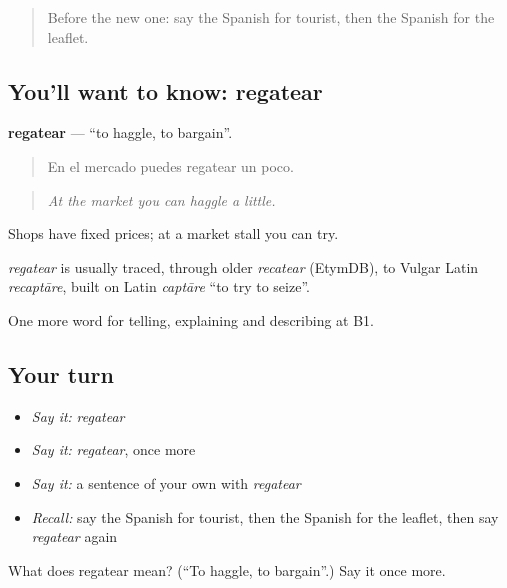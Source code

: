 \label{lesson:ES-C676-regatear}



\begin{quote}
Before the new one: say the Spanish for tourist, then the Spanish for the leaflet.
\end{quote}

\subsection*{You'll want to know: regatear}
\textbf{regatear} — \textquotedblleft{}to haggle, to bargain\textquotedblright{}.

\begin{quote}
En el mercado puedes regatear un poco.
\end{quote}

\begin{quote}
\emph{At the market you can haggle a little.}
\end{quote}

Shops have fixed prices; at a market stall you can try.

\begin{cousinweb}
\emph{regatear} is usually traced, through older \emph{recatear} (EtymDB), to Vulgar Latin \emph{recaptāre}, built on Latin \emph{captāre} \textquotedblleft{}to try to seize\textquotedblright{}.
\end{cousinweb}

\begin{grammarlens}[title={What you've built}]
One more word for telling, explaining and describing at B1.
\end{grammarlens}

\subsection*{Your turn}
\begin{itemize}
\raggedright
  \item \emph{Say it:} \emph{regatear}
  \item \emph{Say it:} \emph{regatear}, once more
  \item \emph{Say it:} a sentence of your own with \emph{regatear}
  \item \emph{Recall:} say the Spanish for tourist, then the Spanish for the leaflet, then say \emph{regatear} again
\end{itemize}

\begin{tcolorbox}[breakable,colback=teal!4,colframe=teal!35!black,title={Before you move on}]
What does regatear mean? (\textquotedblleft{}To haggle, to bargain\textquotedblright{}.) Say it once more.
\end{tcolorbox}
